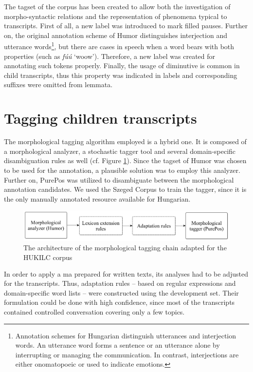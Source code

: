 The tagset of the corpus has been created to allow both the investigation of morpho-syntactic relations and the representation of phenomena typical to transcripts. 
First of all, a new label was introduced to mark filled pauses. 
Further on, the original annotation scheme of Humor distinguishes interjection and utterance words\footnote{Annotation schemes for Hungarian distinguish utterances and interjection words. An utterance word forms a sentence or an utterance alone by interrupting or managing the communication. In contrast, interjections are either onomatopoeic or used to indicate emotions.},
but there are cases in speech when a word bears with both properties (such as \textit{fúú} `woow’). 
Therefore, a new label was created for annotating such tokens properly. 
Finally, the usage of diminutive is common in child transcripts, thus this property was indicated in labels and corresponding suffixes were omitted from lemmata.

\section{Tagging children transcripts}
\label{sec:tagging}
The morphological tagging algorithm employed is a hybrid one. 
It is composed of a morphological analyzer, a stochastic tagger tool and several domain-specific disambiguation rules as well (cf. Figure \ref{fig:speech-tagger}). 
Since the tagset of Humor was chosen to be used for the annotation, a plausible solution was to employ this analyzer. 
Further on, PurePos was utilized to disambiguate between the morphological annotation candidates. 
We used the Szeged Corpus \cite{Csendes2004} to train the tagger, since it is the only manually annotated resource available for Hungarian. 

\begin{figure}[H]
  \centering
  \includegraphics[scale=0.2]{MorphComplexity/mlu_architecture.png} 
  \caption{The architecture of the morphological tagging chain adapted for the HUKILC corpus}
  \label{fig:speech-tagger}
\end{figure}


In order to apply a \acrlong{ma} prepared for written texts, its analyses had to be adjusted for the transcripts. 
Thus, adaptation rules -- based on regular expressions and domain-specific word lists -- were constructed using the development set.
Their formulation could be done with high confidence, since most of the transcripts contained controlled conversation covering only a few topics. 


